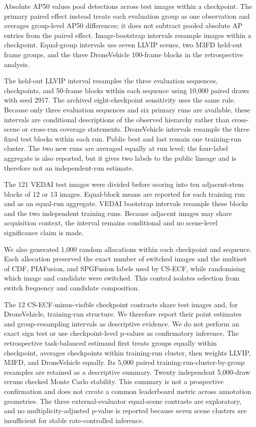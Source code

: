 \documentclass[preprint,11pt]{elsarticle}
\begin{document}
Absolute AP50 values pool detections across test images within a checkpoint.
The primary paired effect instead treats each evaluation group as one
observation and averages group-level AP50 differences; it does not subtract
pooled absolute AP entries from the paired effect. Image-bootstrap intervals
resample images within a checkpoint. Equal-group intervals use seven LLVIP
scenes, two M3FD held-out
frame groups, and the three DroneVehicle 100-frame blocks in the retrospective
analysis.

The held-out LLVIP interval resamples the three evaluation sequences,
checkpoints, and 50-frame blocks within each sequence using 10,000 paired draws
with seed 2917. The archived eight-checkpoint sensitivity uses the same rule.
Because only three evaluation sequences and six primary runs are available,
these intervals are conditional descriptions of the observed hierarchy rather
than cross-scene or cross-run coverage statements. DroneVehicle intervals
resample the three fixed test blocks within each run. Public best and last
remain one training-run cluster. The two new runs are averaged equally at run
level; the four-label aggregate is also reported, but it gives two labels to
the public lineage and is therefore not an independent-run estimate.

The 121 VEDAI test images were divided before scoring into ten adjacent-stem
blocks of 12 or 13 images. Equal-block means are reported for each training
run and as an equal-run aggregate. VEDAI bootstrap intervals resample these
blocks and the two independent training runs. Because adjacent images may
share acquisition context, the interval remains conditional and no
scene-level significance claim is made.

We also generated 1,000 random allocations within each checkpoint and sequence.
Each allocation preserved the exact number of switched images and the multiset
of CDF, PIAFusion, and SPGFusion labels used by CS-ECF, while randomising which
image and candidate were switched. This control isolates selection from switch
frequency and candidate composition.

The 12 CS-ECF-minus-visible checkpoint contrasts share test images and, for
DroneVehicle, training-run structure. We therefore report their point estimates
and group-resampling intervals as descriptive evidence. We do not perform an
exact sign test or use checkpoint-level p-values as confirmatory inference.
The retrospective task-balanced estimand first treats groups equally within
checkpoint, averages checkpoints within training-run cluster, then weights
LLVIP, M3FD, and DroneVehicle equally. Its 5,000 paired
training-run-cluster-by-group resamples are retained as a descriptive
summary. Twenty independent 5,000-draw reruns checked Monte Carlo stability.
This summary is not a prospective confirmation and does not create a common
leaderboard metric across annotation geometries. The three external-evaluator
equal-scene contrasts are exploratory, and no multiplicity-adjusted p-value is
reported because seven scene clusters are insufficient for stable
rate-controlled inference.
\end{document}
